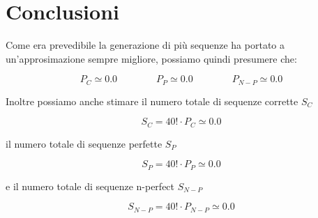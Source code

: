 \documentclass[a4paper]{article}
\begin{document}
\newpage

\section{Conclusioni}

Come era prevedibile la generazione di più sequenze ha portato a un'approsimazione sempre migliore, possiamo quindi presumere che:

\begin{equation*}
    P_C \simeq 0.0
    \qquad
    \qquad
    P_P \simeq 0.0
    \qquad
    \qquad
    P_{N-P} \simeq 0.0
\end{equation*}

\vspace{0.5cm}
\noindent
Inoltre possiamo anche stimare il numero totale di sequenze corrette $S_C$

\begin{equation*}
    S_C  = 40! \cdot P_C \simeq 0.0
\end{equation*}

\vspace{0.5cm}
\noindent
il numero totale di sequenze perfette $S_P$

\begin{equation*}
    S_P  = 40! \cdot P_P \simeq 0.0
\end{equation*}

\vspace{0.5cm}
\noindent
e il numero totale di sequenze n-perfect $S_{N-P}$

\begin{equation*}
    S_{N-P}  = 40! \cdot P_{N-P} \simeq 0.0
\end{equation*}
\end{document}

